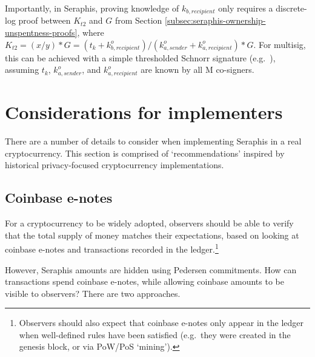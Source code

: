 \begin{itemize}
    Importantly, in Seraphis, proving knowledge of $k_{b, recipient}$ only requires a discrete-log proof between $K_{t2}$ and $G$ from Section \ref{subsec:seraphis-ownership-unspentness-proofs}, where $K_{t2} = (x/y)*G = (t_k + k^o_{b, recipient})/(k^o_{a, sender} + k^o_{a, recipient})*G$. For multisig, this can be achieved with a simple thresholded Schnorr signature (e.g.\ \cite{...}), assuming $t_k$, $k^o_{a, sender}$, and $k^o_{a, recipient}$ are known by all M co-signers.
\end{itemize}



\section{Considerations for implementers}
\label{sec:considerations-implementers}

There are a number of details to consider when implementing Seraphis in a real cryptocurrency. This section is comprised of `recommendations' inspired by historical privacy-focused cryptocurrency implementations.


\subsection{Coinbase e-notes}
\label{subsec:implementers-coinbase-enotes}

For a cryptocurrency to be widely adopted, observers should be able to verify that the total supply of money matches their expectations, based on looking at coinbase e-notes and transactions recorded in the ledger.\footnote{Observers should also expect that coinbase e-notes only appear in the ledger when well-defined rules have been satisfied (e.g.\ they were created in the genesis block, or via PoW/PoS `mining').}

However, Seraphis amounts are hidden using Pedersen commitments. How can transactions spend coinbase e-notes, while allowing coinbase amounts to be visible to observers? There are two approaches.

